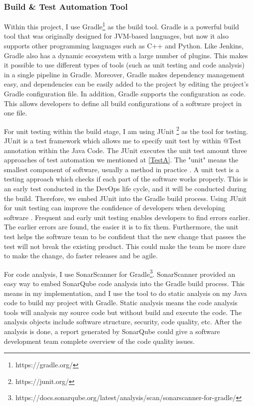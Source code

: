 \subsubsection{Build \& Test Automation Tool}
Within this project, I use Gradle\footnote{https://gradle.org/} as the build tool.
Gradle is a powerful build tool that was originally designed for JVM-based languages, but now it also supports other programming languages such as C++ and Python.
Like Jenkins, Gradle also has a dynamic ecosystem with a large number of plugins. This makes it possible to use different types of tools (such as unit testing and code analysis) in a single pipeline in Gradle. 
Moreover, Gradle makes dependency management easy, and dependencies can be easily added to the project by editing the project's Gradle configuration file. In addition, Gradle supports the configuration as code. This allows developers to define all build configurations of a software project in one file.
\par
For unit testing within the build stage, I am using JUnit \footnote{https://junit.org/} as the tool for testing. JUnit is a test framework which allows me to specify unit test by within @Test annotation within the Java Code. The JUnit executes the unit test amount three approaches of test automation we mentioned at \ref{TestA}. The "unit" means the smallest component of software, usually a method in practice \cite{UnitTest65:online}. A unit test is a testing approach which checks if each part of the software works properly. 
This is an early test conducted in the DevOps life cycle, and it will be conducted during the build. Therefore, we embed JUnit into the Gradle build process. Using JUnit for unit testing can improve the confidence of developers when developing software \cite{UnitTest65:online}. Frequent and early unit testing enables developers to find errors earlier. The earlier errors are found, the easier it is to fix them. Furthermore, the unit test helps the software team to be confident that the new change that passes the test will not break the existing product. This could make the team be more dare to make the change, do faster releases and be agile.
\par
For code analysis, I use SonarScanner for Gradle\footnote{https://docs.sonarqube.org/latest/analysis/scan/sonarscanner-for-gradle/}. SonarScanner provided an easy way to embed SonarQube code analysis into the Gradle build process. This means in my implementation, and I use the tool to do static analysis on my Java code to build my project with Gradle. Static analysis means the code analysis tools will analysis my source code but without build and execute the code. The analysis objects include software structure, security, code quality, etc. After the analysis is done, a report generated by SonarQube could give a software development team complete overview of the code quality issues. 
